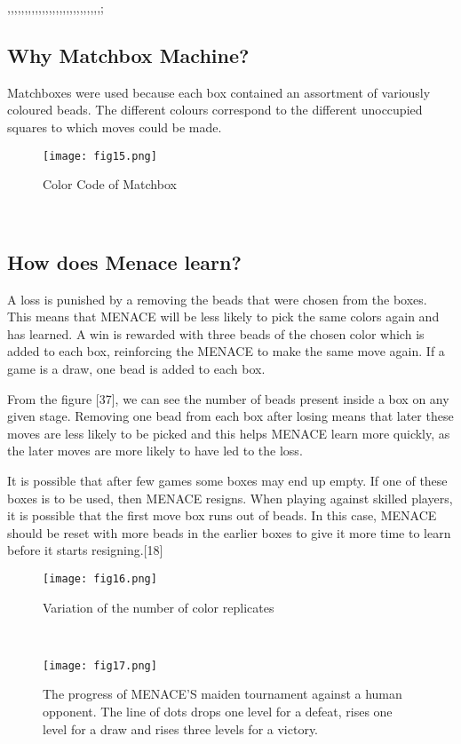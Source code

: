 ,,,,,,,,,,,,,,,,,,,,,,,,,,,;\documentclass[conference]{IEEEtran}
\begin{document}
\subsection{ Why Matchbox Machine?}
\par  Matchboxes were used because each box contained an
assortment of variously coloured beads. The different colours
correspond to the different unoccupied squares to which moves
could be made.
\\ 
\begin{figure}[htbp]
\centerline{\texttt{[image: fig15.png]}}
\caption{Color Code of Matchbox}
\label{figure}
\end{figure}
\\
\subsection{How does Menace learn?}
\par  A loss is punished by a removing the beads that were
chosen from the boxes. This means that MENACE will be  
less likely to pick the same colors again and has learned. A
win is rewarded with three beads of the chosen color which
is added to each box, reinforcing the MENACE to make the
same move again. If a game is a draw, one bead is added to
each box.
\par From the figure [37], we can see the number of beads
present inside a box on any given stage. Removing one bead
from each box after losing means that later these moves are
less likely to be picked and this helps MENACE learn more
quickly, as the later moves are more likely to have led to the
loss.
\par It is possible that after few games some boxes may end
up empty. If one of these boxes is to be used, then MENACE
resigns. When playing against skilled players, it is possible that
the first move box runs out of beads. In this case, MENACE
should be reset with more beads in the earlier boxes to give
it more time to learn before it starts resigning.[18]
\\
\begin{figure}[htbp]
\centerline{\texttt{[image: fig16.png]}}
\caption{Variation of the number of color replicates}
\label{figure}
\end{figure}
\\
\begin{figure}[htbp]
\centerline{\texttt{[image: fig17.png]}}
\caption{The progress of MENACE'S maiden tournament
against a human opponent. The line of dots drops one level
for a defeat, rises one level for a draw and rises three levels
for a victory.}
\label{figure}
\end{figure}
\\
\end{document}
